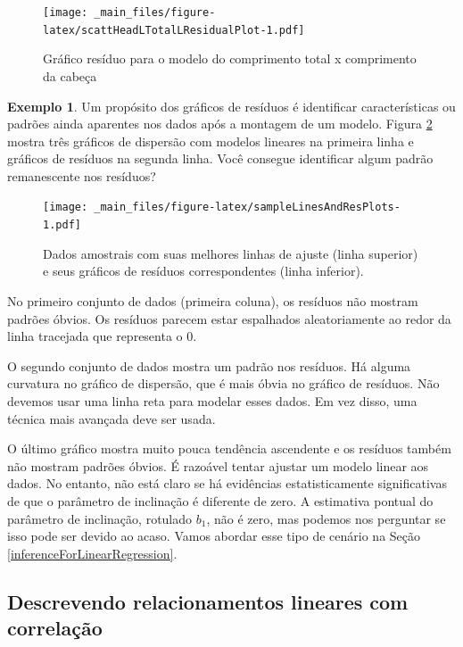 \documentclass[
]{book}
\theoremstyle{definition}
\theoremstyle{definition}
\newtheorem{example}{Exemplo}[chapter]
\theoremstyle{definition}
\theoremstyle{definition}
\theoremstyle{remark}
\begin{document}
\begin{figure}
\centering
\texttt{[image: \_main\_files/figure-latex/scattHeadLTotalLResidualPlot-1.pdf]}
\caption{\label{fig:scattHeadLTotalLResidualPlot}Gráfico resíduo para o modelo do comprimento total x comprimento da cabeça}
\end{figure}

\begin{example}
\protect\hypertarget{exm:unnamed-chunk-270}{}{\label{exm:unnamed-chunk-270} }Um propósito dos gráficos de resíduos é identificar características ou padrões ainda aparentes nos dados após a montagem de um modelo. Figura \ref{fig:sampleLinesAndResPlots} mostra três gráficos de dispersão com modelos lineares na primeira linha e gráficos de resíduos na segunda linha. Você consegue identificar algum padrão remanescente nos resíduos?
\end{example}

\begin{figure}
\centering
\texttt{[image: \_main\_files/figure-latex/sampleLinesAndResPlots-1.pdf]}
\caption{\label{fig:sampleLinesAndResPlots}Dados amostrais com suas melhores linhas de ajuste (linha superior) e seus gráficos de resíduos correspondentes (linha inferior).}
\end{figure}

No primeiro conjunto de dados (primeira coluna), os resíduos não mostram padrões óbvios. Os resíduos parecem estar espalhados aleatoriamente ao redor da linha tracejada que representa o 0.

O segundo conjunto de dados mostra um padrão nos resíduos. Há alguma curvatura no gráfico de dispersão, que é mais óbvia no gráfico de resíduos. Não devemos usar uma linha reta para modelar esses dados. Em vez disso, uma técnica mais avançada deve ser usada.

O último gráfico mostra muito pouca tendência ascendente e os resíduos também não mostram padrões óbvios. É razoável tentar ajustar um modelo linear aos dados. No entanto, não está claro se há evidências estatisticamente significativas de que o parâmetro de inclinação é diferente de zero. A estimativa pontual do parâmetro de inclinação, rotulado \(b_1\), não é zero, mas podemos nos perguntar se isso pode ser devido ao acaso. Vamos abordar esse tipo de cenário na Seção \ref{inferenceForLinearRegression}.

\hypertarget{describingLinearRelationshipCorrelation}{%
\subsection{Descrevendo relacionamentos lineares com correlação}\label{describingLinearRelationshipCorrelation}}
\end{document}

